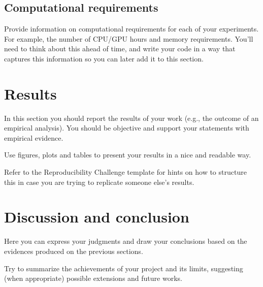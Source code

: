 \documentclass{article}
\begin{document}
	\subsection{Computational requirements}
	Provide information on computational requirements for each of your experiments. For example, the 
	number of CPU/GPU hours and memory requirements. You'll need to think about this ahead of time, 
	and write your code in a way that captures this information so you can later add it to this section. 
	
	\section{Results}
	
	In this section you should report the results of your work (e.g., the outcome of an empirical 
	analysis). You should be objective and support your statements with empirical evidence.
	
	Use figures, plots and tables to present your results in a nice and readable way.
	
	Refer to the Reproducibility Challenge template for hints on how to structure this in case you are 
	trying to replicate someone else's results.
	
	\section{Discussion and conclusion}
	
	Here you can express your judgments and draw your conclusions based on the  evidences produced 
	on the previous sections.
	
	Try to summarize the achievements of your project and its limits, suggesting (when appropriate) 
	possible extensions and future works.
	
	
	
	
	\clearpage
	
\end{document}
